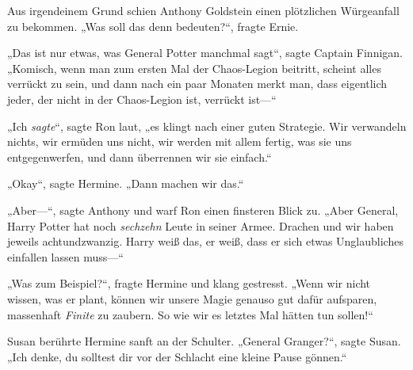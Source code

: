 Aus irgendeinem Grund schien Anthony Goldstein einen plötzlichen Würgeanfall zu bekommen. „Was soll das denn bedeuten?“, fragte Ernie.

„Das ist nur etwas, was General Potter manchmal sagt“, sagte Captain Finnigan. „Komisch, wenn man zum ersten Mal der Chaos-Legion beitritt, scheint alles verrückt zu sein, und dann nach ein paar Monaten merkt man, dass eigentlich jeder, der nicht in der Chaos-Legion ist, verrückt ist—“

„Ich \emph{sagte}“, sagte Ron laut, „es klingt nach einer guten Strategie. Wir verwandeln nichts, wir ermüden uns nicht, wir werden mit allem fertig, was sie uns entgegenwerfen, und dann überrennen wir sie einfach.“

„Okay“, sagte Hermine. „Dann machen wir das.“

„Aber—“, sagte Anthony und warf Ron einen finsteren Blick zu. „Aber General, Harry Potter hat noch \emph{sechzehn} Leute in seiner Armee. Drachen und wir haben jeweils achtundzwanzig. Harry weiß das, er weiß, dass er sich etwas Unglaubliches einfallen lassen muss—“

„Was zum Beispiel?“, fragte Hermine und klang gestresst. „Wenn wir nicht wissen, was er plant, können wir unsere Magie genauso gut dafür aufsparen, massenhaft \emph{Finite} zu zaubern. So wie wir es letztes Mal hätten tun sollen!“

Susan berührte Hermine sanft an der Schulter. „General Granger?“, sagte Susan. „Ich denke, du solltest dir vor der Schlacht eine kleine Pause gönnen.“

